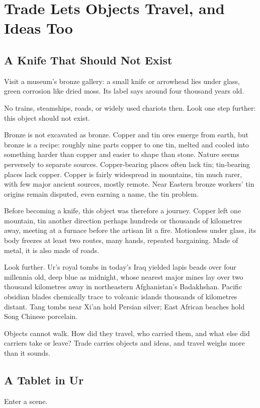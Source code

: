 \chapter[Trade Carries Objects and Ideas]{Trade Lets Objects Travel, and Ideas Too}
\section{A Knife That Should Not Exist}
Visit a museum's bronze gallery: a small knife or arrowhead lies under glass, green corrosion like dried moss. Its label says around four thousand years old.

No trains, steamships, roads, or widely used chariots then. Look one step further: this object should not exist.

Bronze is not excavated as bronze. Copper and tin ores emerge from earth, but bronze is a recipe: roughly nine parts copper to one tin, melted and cooled into something harder than copper and easier to shape than stone. Nature seems perversely to separate sources. Copper-bearing places often lack tin; tin-bearing places lack copper. Copper is fairly widespread in mountains, tin much rarer, with few major ancient sources, mostly remote. Near Eastern bronze workers' tin origins remain disputed, even earning a name, the tin problem.

Before becoming a knife, this object was therefore a journey. Copper left one mountain, tin another direction perhaps hundreds or thousands of kilometres away, meeting at a furnace before the artisan lit a fire. Motionless under glass, its body freezes at least two routes, many hands, repeated bargaining. Made of metal, it is also made of roads.

Look further. Ur's royal tombs in today's Iraq yielded lapis beads over four millennia old, deep blue as midnight, whose nearest major mines lay over two thousand kilometres away in northeastern Afghanistan's Badakhshan. Pacific obsidian blades chemically trace to volcanic islands thousands of kilometres distant. Tang tombs near Xi'an hold Persian silver; East African beaches hold Song Chinese porcelain.

Objects cannot walk. How did they travel, who carried them, and what else did carriers take or leave? Trade carries objects and ideas, and travel weighs more than it sounds.

\section{A Tablet in Ur}
Enter a scene.

